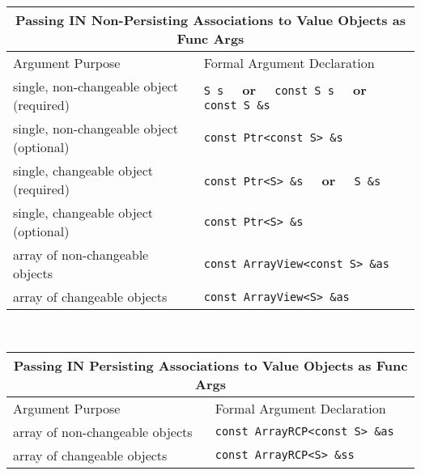 \begin{tabular}{|l|l|}
%
\multicolumn{2}{c}{\textbf{Passing IN Non-Persisting Associations to Value Objects as Func Args}} \\
%
\hline
Argument Purpose
& Formal Argument Declaration \\
\hline
\hline
single, non-changeable object (required)
& {}\texttt{S s} $\;\;\;\;$\textbf{or}$\;\;\;\;$ {}\texttt{const S s} $\;\;\;\;$\textbf{or}$\;\;\;\;$ {}\texttt{const S \&s} \\
\hline
single, non-changeable object (optional)
& {}\texttt{const Ptr<const S> \&s} \\
\hline
single, changeable object (required)
& {}\texttt{const Ptr<S> \&s}  $\;\;\;\;$\textbf{or}$\;\;\;\;$ {}\texttt{S \&s} \\
\hline
single, changeable object (optional)
& \texttt{const Ptr<S> \&s} \\
\hline
array of non-changeable objects
& {}\texttt{const ArrayView<const S> \&as} \\
\hline
array of changeable objects
& {}\texttt{const ArrayView<S> \&as} \\
\hline
%
\end{tabular} \\[3ex]
%
\begin{tabular}{|l|l|}
%
\multicolumn{2}{c}{\textbf{Passing IN Persisting Associations to Value Objects as Func Args}} \\
%
\hline
Argument Purpose
& Formal Argument Declaration \\
\hline
\hline
array of non-changeable objects
& {}\texttt{const ArrayRCP<const S> \&as} \\
\hline
array of changeable objects
& {}\texttt{const ArrayRCP<S> \&ss} \\
\hline
\end{tabular} \\[3ex]
